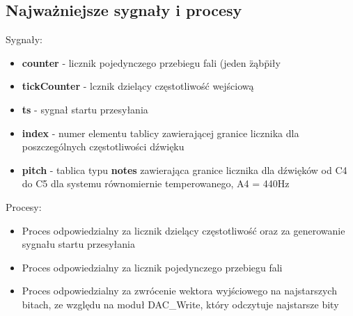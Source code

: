 \documentclass[a4paper]{report}
\begin{document}
		\subsection{Najważniejsze sygnały i procesy}
		{\Large Sygnały:}
			\begin{itemize}
				\item \textbf{counter} - licznik pojedynczego przebiegu fali (jeden \"ząb\" piły
				\item \textbf{tickCounter} - lcznik dzielący częstotliwość wejściową
				\item \textbf{ts} - sygnał startu przesyłania
				\item \textbf{index} - numer elementu tablicy zawierającej granice licznika dla poszczególnych częstotliwości dźwięku
				\item \textbf{pitch} - tablica typu \textbf{notes} zawierająca granice licznika dla dźwięków od C4 do C5 dla systemu równomiernie temperowanego, A4 = 440Hz
			\end{itemize}
		{\Large Procesy:}
			\begin{itemize}
			\item Proces odpowiedzialny za licznik dzielący częstotliwość oraz za generowanie sygnału startu przesyłania\\
				
			\item Proces odpowiedzialny za licznik pojedynczego przebiegu fali\\
				
			\item Proces odpowiedzialny za zwrócenie wektora wyjściowego na najstarszych bitach, ze względu na moduł DAC\_Write, który odczytuje najstarsze bity\\
				
			\end{itemize}
		
\end{document}
